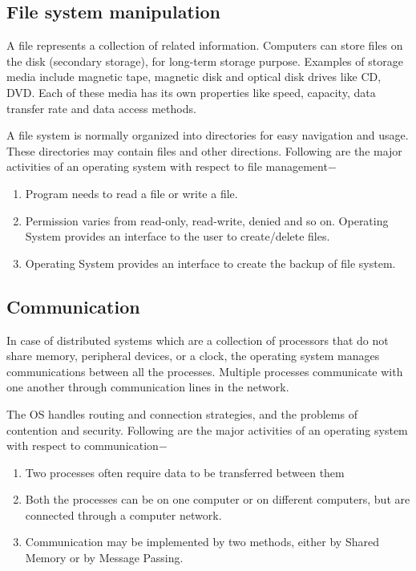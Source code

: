\documentclass[a4paper,10pt]{article}
\begin{document}
  
  \newpage
  \subsection{File system manipulation}
  A file represents a collection of related information. Computers can store files on the disk (secondary storage), for long-term storage purpose. Examples of storage media include magnetic tape, magnetic disk and optical disk drives like CD, DVD. Each of these media has its own properties like speed, capacity, data transfer rate and data access methods.

A file system is normally organized into directories for easy navigation and usage. These directories may contain files and other directions. Following are the major activities of an operating system with respect to file management$-$
 \begin{enumerate}
 \item Program needs to read a file or write a file.
  \item Permission varies from read-only, read-write, denied and so on.
Operating System provides an interface to the user to create/delete files.
   \item Operating System provides an interface to create the backup of file system.
 \end{enumerate}
  \subsection{Communication}
  In case of distributed systems which are a collection of processors that do not share memory, peripheral devices, or a clock, the operating system manages communications between all the processes. Multiple processes communicate with one another through communication lines in the network.

The OS handles routing and connection strategies, and the problems of contention and security. Following are the major activities of an operating system with respect to communication$-$
 \begin{enumerate}
  \item Two processes often require data to be transferred between them
   \item Both the processes can be on one computer or on different computers, but are connected through a computer network.
   \item Communication may be implemented by two methods, either by Shared Memory or by Message Passing.
 \end{enumerate}
 \newpage
\end{document}
